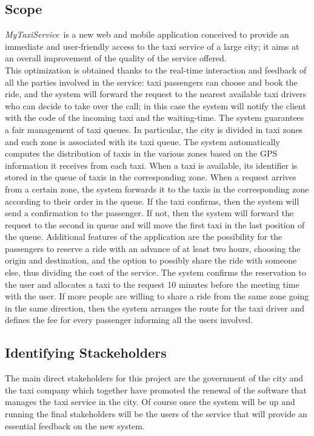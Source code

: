 \documentclass[a4paper,11pt]{report} %
\newcommand{\mts}{\mbox{\normalfont\itshape MyTaxiService\ }}
\begin{document}
	\subsection{Scope} \label{sec:scope}
	\mts is a new web and mobile application conceived to provide an immediate and user-friendly access to the taxi service of a large city; it aims at an overall improvement of the quality of the service offered.\\
	This optimization is obtained thanks to the real-time interaction and feedback of all the parties involved in the service: taxi passengers can choose and book the ride, and the system will forward the request to the nearest available taxi drivers who can decide to take over the call; in this case the system will notify the client with the code of the incoming taxi and the waiting-time.
	The	system	guarantees a fair management of taxi queues. In particular, the city is divided in taxi zones and each zone is associated with its taxi queue. The system automatically computes the distribution of taxis in the various zones based on the GPS information it receives from each taxi. When a taxi is available, its identifier is stored in the queue of taxis in the corresponding zone. When a request arrives from a certain zone, the system forwards it to the taxis in the corresponding zone according to their order in the queue. If the taxi confirms, then the system will send a confirmation to the passenger. If not, then the system will forward the request to the second in queue and will move the first taxi in the last position of the queue.
	Additional features of the application are the possibility for the passengers to reserve a ride with an advance of at least two hours, choosing the origin and destination, and the option to possibly share the ride with someone else, thus dividing the cost of the service. The system confirms the reservation to the user and allocates a taxi to the request 10 minutes before the meeting time with the user. If more people are willing to share a ride from the same zone going in the same direction, then the system arranges the route for the taxi driver and defines the fee for every passenger informing all the users involved. 
	
			
	\subsection{Identifying Stackeholders} The main direct stakeholders for this project are the government of the city and the taxi company which together have promoted the renewal of the software that manages the taxi service in the city. Of course once the system will be up and running the final stakeholders will be the users of the service that will provide an essential feedback on the new system.
	
\end{document}
